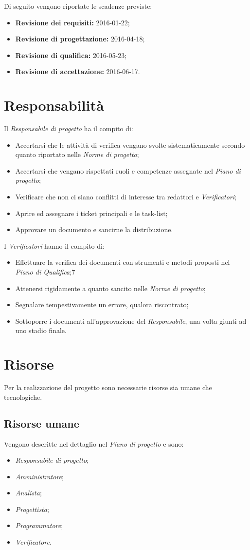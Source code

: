 \documentclass[a4paper]{report}
\begin{document}
			Di seguito vengono riportate le scadenze previste:
			\begin{itemize}
				\item \textbf{Revisione dei requisiti:} 2016-01-22;
				\item \textbf{Revisione di progettazione:} 2016-04-18;
				\item \textbf{Revisione di qualifica:} 2016-05-23;
				\item \textbf{Revisione di accettazione:} 2016-06-17.
			\end{itemize}
		\section{Responsabilità}
			Il \emph{Responsabile di progetto} ha il compito di:
			\begin{itemize}
				\item Accertarsi che le attività di verifica vengano svolte sistematicamente secondo quanto 
				riportato nelle \emph{Norme di progetto};
				\item Accertarsi che vengano rispettati ruoli e competenze assegnate nel \emph{Piano di progetto};
				\item Verificare che non ci siano conflitti di interesse tra redattori e \emph{Verificatori};
				\item Aprire ed assegnare i ticket principali e le task-list;
				\item Approvare un documento e sancirne la distribuzione.
			\end{itemize}
			I \emph{Verificatori} hanno il compito di:
			\begin{itemize}
				\item Effettuare la verifica dei documenti con strumenti e metodi proposti nel \emph{Piano di Qualifica};7
				\item Attenersi rigidamente a quanto sancito nelle \emph{Norme di progetto};
				\item Segnalare tempestivamente un errore, qualora riscontrato;
				\item Sottoporre i documenti all'approvazione del \emph{Responsabile}, una volta giunti ad uno stadio finale.
			\end{itemize}
		\section{Risorse}
			Per la realizzazione del progetto sono necessarie risorse sia umane che tecnologiche.
			\subsection{Risorse umane}
				Vengono descritte nel dettaglio nel \emph{Piano di progetto} e sono:
				\begin{itemize}
					\item \emph{Responsabile di progetto};
					\item \emph{Amministratore};
					\item \emph{Analista};
					\item \emph{Progettista};
					\item \emph{Programmatore};
					\item \emph{Verificatore}.
				\end{itemize}
\end{document}
